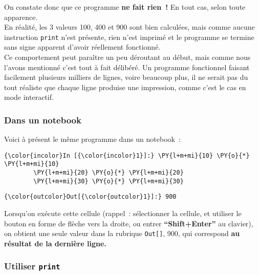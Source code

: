     On constate donc que ce programme \textbf{ne fait rien~!} En tout cas,
selon toute apparence.\\

En réalité, les 3 valeurs 100, 400 et 900 sont bien calculées, mais
comme aucune instruction \texttt{print} n'est présente, rien n'est
imprimé et le programme se termine sans signe apparent d'avoir
réellement fonctionné.\\

Ce comportement peut paraître un peu déroutant au début, mais comme nous
l'avons mentionné c'est tout à fait délibéré. Un programme fonctionnel
faisant facilement plusieurs milliers de lignes, voire beaucoup plus, il
ne serait pas du tout réaliste que chaque ligne produise une impression,
comme c'est le cas en mode interactif.

    \hypertarget{dans-un-notebook}{%
\subsubsection{Dans un notebook}\label{dans-un-notebook}}

    Voici à présent le même programme dans un notebook~:

    \begin{Verbatim}[commandchars=\\\{\}]
{\color{incolor}In [{\color{incolor}1}]:} \PY{l+m+mi}{10} \PY{o}{*} \PY{l+m+mi}{10}
        \PY{l+m+mi}{20} \PY{o}{*} \PY{l+m+mi}{20}
        \PY{l+m+mi}{30} \PY{o}{*} \PY{l+m+mi}{30}
\end{Verbatim}


\begin{Verbatim}[commandchars=\\\{\}]
{\color{outcolor}Out[{\color{outcolor}1}]:} 900
\end{Verbatim}
            
    Lorsqu'on exécute cette cellule (rappel~: sélectionner la cellule, et
utiliser le bouton en forme de flèche vers la droite, ou entrer
\textbf{``Shift+Enter''} au clavier), on obtient une seule valeur dans
la rubrique \texttt{Out{[}{]}}, 900, qui correspond \textbf{au résultat
de la dernière ligne.}

    \hypertarget{utiliser-print}{%
\subsubsection{\texorpdfstring{Utiliser
\texttt{print}}{Utiliser print}}\label{utiliser-print}}

